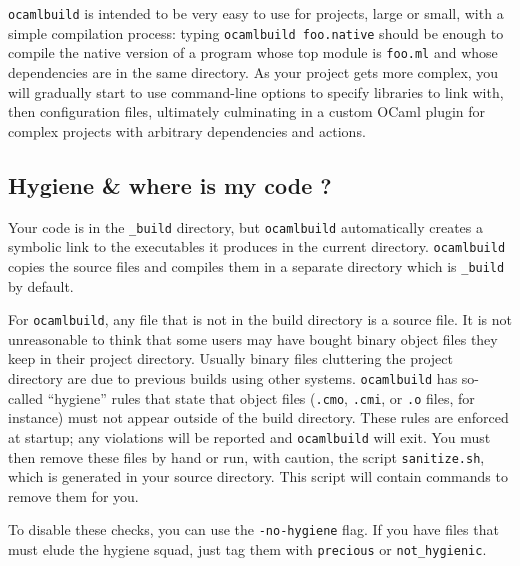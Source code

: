 \documentclass[9pt]{article}
\newcommand{\ocb}{\texttt{ocamlbuild}\xspace}
\begin{document}
\ocb is intended to be very easy to use for projects, large or small, with a simple
compilation process: typing
\texttt{ocamlbuild foo.native} should be enough to compile the native version
of a program whose top module is \texttt{foo.ml} and whose dependencies are in
the same directory.  As your project gets more complex, you will gradually
start to use command-line options to specify libraries to link with, then
configuration files, ultimately culminating in a custom OCaml plugin for
complex projects with arbitrary dependencies and actions.

\subsection{Hygiene \& where is my code ?}
Your code is in the \texttt{\_build} directory, but \ocb automatically creates
a symbolic link to the executables it produces in the current directory.
\ocb copies the source files and compiles them in a separate directory
which is \texttt{\_build} by default.  

For \ocb, any file that is not in the build directory is a source file.
It is not unreasonable to think that some users may have bought binary object files
they keep in their project directory.  Usually binary files cluttering the project
directory are due to previous builds using other systems.  \ocb has so-called
``hygiene'' rules that state that object files (\texttt{.cmo}, \texttt{.cmi},
or \texttt{.o} files, for instance) must not appear outside of the build
directory.  These rules are enforced at startup; any violations will be reported
and \ocb will exit.  You must then remove these files by hand or run, with caution,
the script \texttt{sanitize.sh}, which is generated in your source directory.
This script will contain commands to remove them for you.

To disable these checks, you can use the \texttt{-no-hygiene} flag.  If you have
files that must elude the hygiene squad, just tag them with \texttt{precious}
or \texttt{not\_hygienic}.
\end{document}
